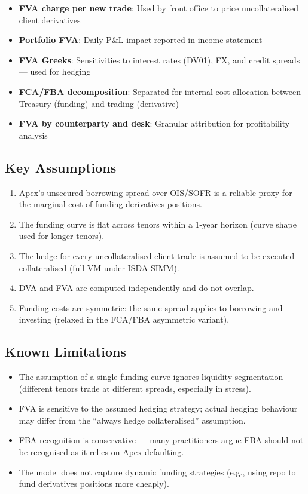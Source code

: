 \documentclass[11pt,a4paper]{article}
\begin{document}
\begin{itemize}[leftmargin=*]
  \item \textbf{FVA charge per new trade}: Used by front office to price uncollateralised client derivatives
  \item \textbf{Portfolio FVA}: Daily P\&L impact reported in income statement
  \item \textbf{FVA Greeks}: Sensitivities to interest rates (DV01), FX, and credit spreads --- used for hedging
  \item \textbf{FCA/FBA decomposition}: Separated for internal cost allocation between Treasury (funding) and trading (derivative)
  \item \textbf{FVA by counterparty and desk}: Granular attribution for profitability analysis
\end{itemize}

\subsection{Key Assumptions}

\begin{enumerate}[leftmargin=*]
  \item Apex's unsecured borrowing spread over OIS/SOFR is a reliable proxy for the marginal cost of funding derivatives positions.
  \item The funding curve is flat across tenors within a 1-year horizon (curve shape used for longer tenors).
  \item The hedge for every uncollateralised client trade is assumed to be executed collateralised (full VM under ISDA SIMM).
  \item DVA and FVA are computed independently and do not overlap.
  \item Funding costs are symmetric: the same spread applies to borrowing and investing (relaxed in the FCA/FBA asymmetric variant).
\end{enumerate}

\subsection{Known Limitations}

\begin{itemize}[leftmargin=*]
  \item The assumption of a single funding curve ignores liquidity segmentation (different tenors trade at different spreads, especially in stress).
  \item FVA is sensitive to the assumed hedging strategy; actual hedging behaviour may differ from the ``always hedge collateralised'' assumption.
  \item FBA recognition is conservative --- many practitioners argue FBA should not be recognised as it relies on Apex defaulting.
  \item The model does not capture dynamic funding strategies (e.g., using repo to fund derivatives positions more cheaply).
\end{itemize}
\end{document}
